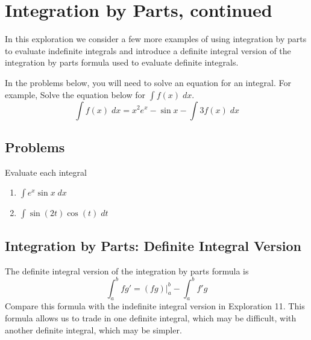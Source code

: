 \documentclass[12pt,letterpaper,fleqn]{article}
\theoremstyle{definition}
\begin{document}
\section*{Integration by Parts, continued}
In this exploration we consider a few more examples of using integration by parts to evaluate indefinite integrals and introduce a definite integral version of the integration by parts formula used to evaluate definite integrals.

In the problems below, you will need to solve an equation for an integral. For example, Solve the equation below for $\int f(x)\;dx$.
\begin{equation*}
  \int f(x)\;dx = x^2 e^x - \sin x - \int 3f(x)\;dx
\end{equation*}
\subsection*{Problems}
Evaluate each integral
\begin{enumerate}
  \item $\int e^x \sin x\;dx$
  \item $\int \sin(2t)\cos(t)\;dt$
\end{enumerate}

\subsection*{Integration by Parts: Definite Integral Version}
The definite integral version of the integration by parts formula is
\begin{equation*}
  \int_a^b fg' = \left.(fg)\right|_a^b - \int_a^b f'g
\end{equation*}
Compare this formula with the indefinite integral version in Exploration 11. This formula allows us to trade in one definite integral, which may be difficult, with another definite integral, which may be simpler.
\end{document}
